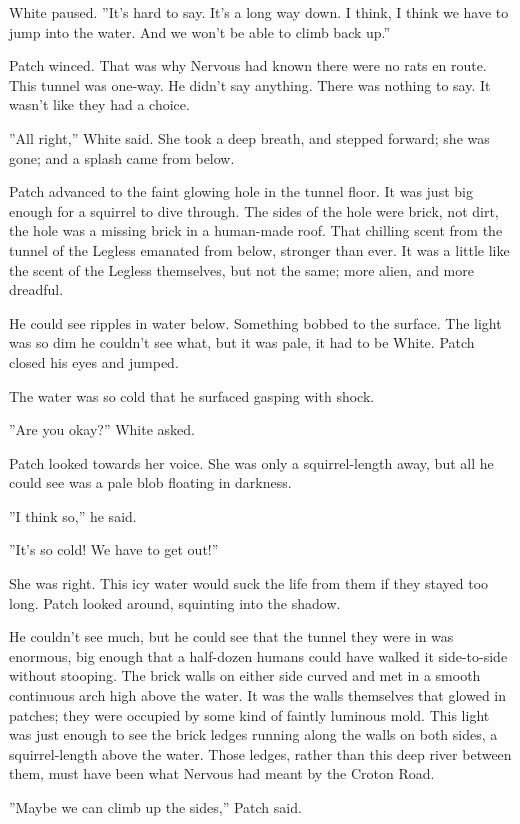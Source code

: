 \documentclass[12pt]{book}
\begin{document}
White paused. ''It's hard to say. It's a long way down. I think, I think we have to jump into the water. And we won't be able to climb back up.''

Patch winced. That was why Nervous had known there were no rats en route. This tunnel was one-way. He didn't say anything. There was nothing to say. It wasn't like they had a choice.

''All right,'' White said. She took a deep breath, and stepped forward; she was gone; and a splash came from below.

Patch advanced to the faint glowing hole in the tunnel floor. It was just big enough for a squirrel to dive through. The sides of the hole were brick, not dirt, the hole was a missing brick in a human-made roof. That chilling scent from the tunnel of the Legless emanated from below, stronger than ever. It was a little like the scent of the Legless themselves, but not the same; more alien, and more dreadful.

He could see ripples in water below. Something bobbed to the surface. The light was so dim he couldn't see what, but it was pale, it had to be White. Patch closed his eyes and jumped.

The water was so cold that he surfaced gasping with shock.

''Are you okay?'' White asked.

Patch looked towards her voice. She was only a squirrel-length away, but all he could see was a pale blob floating in darkness.

''I think so,'' he said.

''It's so cold! We have to get out!''

She was right. This icy water would suck the life from them if they stayed too long. Patch looked around, squinting into the shadow.

He couldn't see much, but he could see that the tunnel they were in was enormous, big enough that a half-dozen humans could have walked it side-to-side without stooping. The brick walls on either side curved and met in a smooth continuous arch high above the water. It was the walls themselves that glowed in patches; they were occupied by some kind of faintly luminous mold. This light was just enough to see the brick ledges running along the walls on both sides, a squirrel-length above the water. Those ledges, rather than this deep river between them, must have been what Nervous had meant by the Croton Road.

''Maybe we can climb up the sides,'' Patch said.
\end{document}
